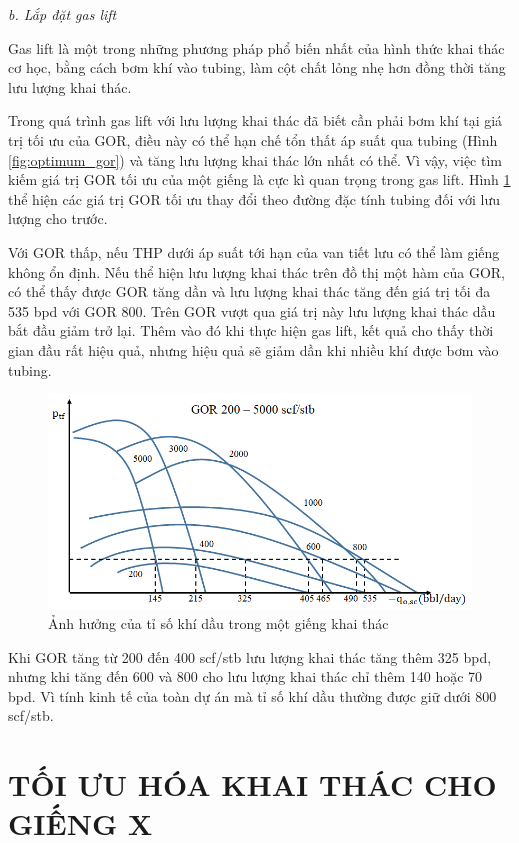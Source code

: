 \documentclass[12pt,a4paper]{report}
\begin{document}
\textit{b. Lắp đặt gas lift}

Gas lift là một trong những phương pháp phổ biến nhất của hình thức khai thác cơ học, bằng cách bơm khí vào tubing, làm cột chất lỏng nhẹ hơn đồng thời tăng lưu lượng khai thác.

Trong quá trình gas lift với lưu lượng khai thác đã biết cần phải bơm khí tại giá trị tối ưu của GOR, điều này có thể hạn chế tổn thất áp suất qua tubing (Hình \ref{fig:optimum_gor}) và tăng lưu lượng khai thác lớn nhất có thể. Vì vậy, việc tìm kiếm giá trị GOR tối ưu của một giếng là cực kì quan trọng trong gas lift. Hình \ref{fig:or_of_production_well} thể hiện các giá trị GOR tối ưu thay đổi theo đường đặc tính tubing đối với lưu lượng cho trước.

Với GOR thấp, nếu THP dưới áp suất tới hạn của van tiết lưu có thể làm giếng không ổn định. Nếu thể hiện lưu lượng khai thác trên đồ thị một hàm của GOR, có thể thấy được GOR tăng dần và lưu lượng khai thác tăng đến giá trị tối đa 535 bpd với GOR 800. Trên GOR vượt qua giá trị này lưu lượng khai thác dầu bắt đầu giảm trở lại. Thêm vào đó khi thực hiện gas lift, kết quả cho thấy thời gian đầu rất hiệu quả, nhưng hiệu quả sẽ giảm dần khi nhiều khí được bơm vào tubing. 
\newpage
	\begin{figure}[h]
		\centering
		\includegraphics[scale=0.7]{Fig/gor_of_production_well.png}
		\caption[Ảnh hưởng của tỉ số khí dầu trong một giếng khai thác]{Ảnh hưởng của tỉ số khí dầu trong một giếng khai thác \cite{jansen2004modelling}}
		\label{fig:or_of_production_well}
	\end{figure}
Khi GOR tăng từ 200 đến 400 scf/stb lưu lượng khai thác tăng thêm 325 bpd, nhưng khi tăng đến 600 và 800 cho lưu lượng khai thác chỉ thêm 140 hoặc 70 bpd. Vì tính kinh tế của toàn dự án mà tỉ số khí dầu thường được giữ dưới 800 scf/stb.

\chapter{TỐI ƯU HÓA KHAI THÁC CHO GIẾNG X}
\end{document}
